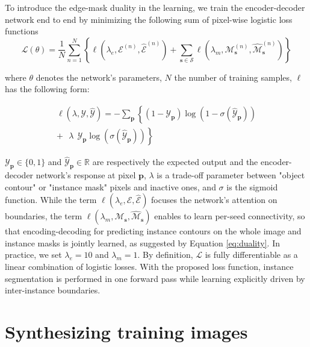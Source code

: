 \documentclass[runningheads,a4paper]{llncs}
\begin{document}
To introduce the edge-mask duality in the learning, we train the encoder-decoder network end to end by minimizing the following sum of pixel-wise logistic loss functions
\begin{equation}
\mathcal{L}(\theta) = \frac{1}{N}\sum_{n=1}^{N} \left\{ \ell(\lambda_e, \mathcal{E}^{(n)}, \hat{\mathcal{E}}^{(n)}) + \sum_{\mathbf{s}\in \mathcal{S}} \ell(\lambda_m, \mathcal{M}_\mathbf{s}^{(n)}, \hat{\mathcal{M}}_\mathbf{s}^{(n)}) \right\}
\end{equation}

\noindent where $\theta$ denotes the network's parameters, $N$ the number of training samples, $\ell$ has the following form:

\begin{equation}
\begin{split}
\ell(\lambda, \mathcal{Y}, \hat{\mathcal{Y}}) = - \sum_\mathbf{p} \left\{ (1-\mathcal{Y}_\mathbf{p})\log(1 - \sigma(\hat{\mathcal{Y}}_\mathbf{p})) \right. \\
\left. +\ \ \ \lambda\ \ \mathcal{Y}_\mathbf{p}\log(\sigma(\hat{\mathcal{Y}}_\mathbf{p})) \right\}
\end{split}
\end{equation}

\noindent $\mathcal{Y}_\mathbf{p}\in\{0,1\}$ and $\hat{\mathcal{Y}}_\mathbf{p}\in\mathbb{R}$ are respectively the expected output and the encoder-decoder network's response at pixel $\mathbf{p}$, $\lambda$ is a trade-off parameter between "object contour" or "instance mask" pixels and inactive ones, and $\sigma$ is the sigmoid function. While the term $\ell(\lambda_e, \mathcal{E}, \hat{\mathcal{E}})$ focuses the network's attention on boundaries, the term $\ell(\lambda_m, \mathcal{M}_\mathbf{s}, \hat{\mathcal{M}}_\mathbf{s})$ enables to learn per-seed connectivity, so that encoding-decoding for predicting instance contours on the whole image and instance masks is jointly learned, as suggested by Equation \ref{eq:duality}. In practice, we set $\lambda_e=10$ and $\lambda_m=1$. By definition, $\mathcal{L}$ is fully differentiable as a linear combination of logistic losses. With the proposed loss function, instance segmentation is performed in one forward pass while learning explicitly driven by inter-instance boundaries.

\section{Synthesizing training images}
\label{sec:synthesizing}
\end{document}
